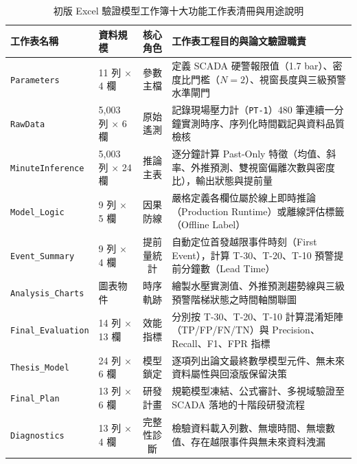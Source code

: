 \documentclass[fontset=none, a4paper, 12pt]{ctexart}
\begin{document}
\begin{doublespace}
\begin{table}[H]
\centering
\caption{初版 Excel 驗證模型工作簿十大功能工作表清冊與用途說明}
\label{tab:excel_sheets_register}
\scriptsize
\renewcommand{\arraystretch}{1.2}
\setlength{\tabcolsep}{3pt}
\begin{tabularx}{\textwidth}{llcX}
\toprule
\textbf{工作表名稱} & \textbf{資料規模} & \textbf{核心角色} & \textbf{工作表工程目的與論文驗證職責} \\
\midrule
\texttt{Parameters} & 11 列 $\times$ 4 欄 & 參數主檔 & 定義 SCADA 硬警報限值（1.7 bar）、密度比門檻（$N=2$）、視窗長度與三級預警水準閘門 \\
\texttt{RawData} & 5,003 列 $\times$ 6 欄 & 原始遙測 & 記錄現場壓力計（\texttt{PT-1}）480 筆連續一分鐘實測時序、序列化時間戳記與資料品質檢核 \\
\texttt{MinuteInference} & 5,003 列 $\times$ 24 欄 & 推論主表 & 逐分鐘計算 Past-Only 特徵（均值、斜率、外推預測、雙視窗偏離次數與密度比），輸出狀態與提前量 \\
\texttt{Model\_Logic} & 9 列 $\times$ 5 欄 & 因果防線 & 嚴格定義各欄位屬於線上即時推論（Production Runtime）或離線評估標籤（Offline Label） \\
\texttt{Event\_Summary} & 9 列 $\times$ 4 欄 & 提前量統計 & 自動定位首發越限事件時刻（First Event），計算 T-30、T-20、T-10 預警提前分鐘數（Lead Time） \\
\texttt{Analysis\_Charts} & 圖表物件 & 時序軌跡 & 繪製水壓實測值、外推預測趨勢線與三級預警階梯狀態之時間軸關聯圖 \\
\texttt{Final\_Evaluation} & 14 列 $\times$ 13 欄 & 效能指標 & 分別按 T-30、T-20、T-10 計算混淆矩陣（TP/FP/FN/TN）與 Precision、Recall、F1、FPR 指標 \\
\texttt{Thesis\_Model} & 24 列 $\times$ 6 欄 & 模型鎖定 & 逐項列出論文最終數學模型元件、無未來資料屬性與回滾版保留決策 \\
\texttt{Final\_Plan} & 13 列 $\times$ 6 欄 & 研發計畫 & 規範模型凍結、公式審計、多視域驗證至 SCADA 落地的十階段研發流程 \\
\texttt{Diagnostics} & 13 列 $\times$ 4 欄 & 完整性診斷 & 檢驗資料載入列數、無壞時間、無壞數值、存在越限事件與無未來資料洩漏 \\
\bottomrule
\end{tabularx}
\end{table}


\end{doublespace}
\end{document}
